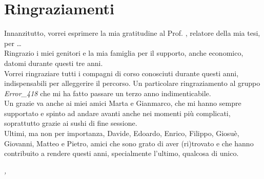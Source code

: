 \cleardoublepage
{}
{}

\bigskip

\begingroup
\let\clearpage\relax
\let\cleardoublepage\relax
\let\cleardoublepage\relax

\chapter*{Ringraziamenti}

Innanzitutto, vorrei esprimere la mia gratitudine al Prof. \myProf, relatore della mia tesi, per \dots \\

\noindent Ringrazio i miei genitori e la mia famiglia per il supporto, anche economico, datomi durante questi tre anni.\\

\noindent Vorrei ringraziare tutti i compagni di corso conosciuti durante questi anni, indispensabili per alleggerire il percorso. Un particolare ringraziamento al gruppo \textit{Error\_418} che mi ha fatto passare un terzo anno indimenticabile.\\

\noindent Un grazie va anche ai miei amici Marta e Gianmarco, che mi hanno sempre supportato e spinto ad andare avanti anche nei momenti più complicati, soprattutto grazie ai sushi di fine sessione.\\

\noindent Ultimi, ma non per importanza, Davide, Edoardo, Enrico, Filippo, Giosuè, Giovanni, Matteo e Pietro, amici che sono grato di aver (ri)trovato e che hanno contribuito a rendere questi anni, specialmente l'ultimo, qualcosa di unico.

\bigskip

\noindent\textit{\myLocation, \myTime}
\hfill \myName

\endgroup

